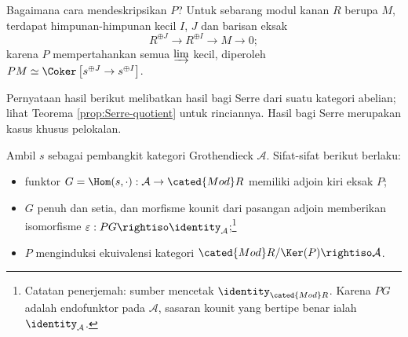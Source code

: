 Bagaimana cara mendeskripsikan $P$? Untuk sebarang modul kanan $R$ berupa $M$, terdapat himpunan-himpunan kecil $I$, $J$ dan barisan eksak
\[ R^{\oplus J} \to R^{\oplus I} \to M \to 0; \]
karena $P$ mempertahankan semua $\varinjlim$ kecil, diperoleh $PM \simeq \Coker\left[ s^{\oplus J} \to s^{\oplus I} \right]$.

Pernyataan hasil berikut melibatkan hasil bagi Serre dari suatu kategori abelian; lihat Teorema \ref{prop:Serre-quotient} untuk rinciannya. Hasil bagi Serre merupakan kasus khusus pelokalan.

\begin{theorem}\label{prop:GP}
	Ambil $s$ sebagai pembangkit kategori Grothendieck $\mathcal{A}$. Sifat-sifat berikut berlaku:
	\begin{itemize}
		\item funktor $G = \Hom(s, \cdot): \mathcal{A} \to \cated{Mod}R$ memiliki adjoin kiri eksak $P$;
		\item $G$ penuh dan setia, dan morfisme kounit dari pasangan adjoin memberikan isomorfisme $\varepsilon: PG \rightiso \identity_{\mathcal{A}}$;\footnote{Catatan penerjemah: sumber mencetak $\identity_{\cated{Mod}R}$. Karena $PG$ adalah endofunktor pada $\mathcal{A}$, sasaran kounit yang bertipe benar ialah $\identity_{\mathcal{A}}$.}
		\item $P$ menginduksi ekuivalensi kategori $\cated{Mod}R / \Ker(P) \rightiso \mathcal{A}$.
	\end{itemize}
\end{theorem}
